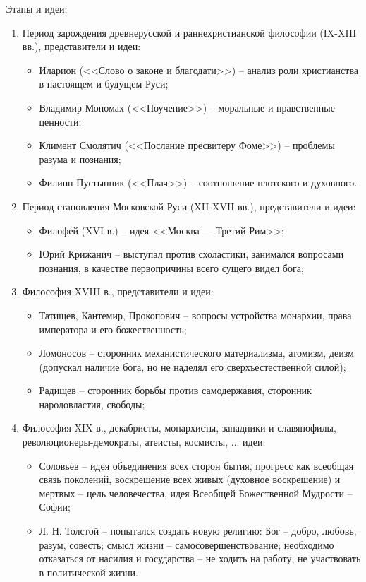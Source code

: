 Этапы и идеи:
\begin{enumerate}
	\itemsep-1ex
	\item Период зарождения древнерусской и раннехристианской философии (IX-XIII вв.), представители и идеи:
	\begin{itemize}
		\itemsep-.5ex
		\item Иларион (<<Слово о законе и благодати>>) -- анализ роли христианства в настоящем и будущем Руси;
		\item Владимир Мономах (<<Поучение>>) -- моральные и нравственные ценности;
		\item Климент Смолятич (<<Послание пресвитеру Фоме>>) -- проблемы разума и познания;
		\item Филипп Пустынник (<<Плач>>) -- соотношение плотского и духовного.
	\end{itemize}
	\item Период становления Московской Руси (XII-XVII вв.), представители и идеи:
	\begin{itemize}
		\itemsep-.5ex
		\item Филофей (XVI в.) -- идея <<Москва --- Третий Рим>>;
		\item Юрий Крижанич -- выступал против схоластики, занимался вопросами познания, в качестве первопричины всего сущего видел бога;
	\end{itemize}
	\item Философия XVIII в., представители и идеи:
	\begin{itemize}
		\itemsep-.5ex
		\item Татищев, Кантемир, Прокопович -- вопросы устройства монархии, права императора и его божественность;
		\item Ломоносов -- сторонник механистического материализма, атомизм, деизм (допускал наличие бога, но не наделял его сверхъестественной силой);
		\item Радищев -- сторонник борьбы против самодержавия, сторонник народовластия, свободы;
	\end{itemize}
	\item Философия XIX в., декабристы, монархисты, западники и славянофилы, революционеры-де\-мо\-кра\-ты, атеисты, космисты, ... идеи:
	\begin{itemize}
		\itemsep-.5ex
		\item Соловьёв -- идея объединения всех сторон бытия, прогресс как всеобщая связь поколений, воскрешение всех живых (духовное воскрешение) и мертвых -- цель человечества, идея Всеобщей Божественной Мудрости -- Софии;
		\item Л. Н. Толстой -- попытался создать новую религию: Бог -- добро, любовь, разум, совесть; смысл жизни -- самосовершенствование; необходимо отказаться от насилия и государства -- не ходить на работу, не участвовать в политической жизни.

\end{itemize}
\end{enumerate}
